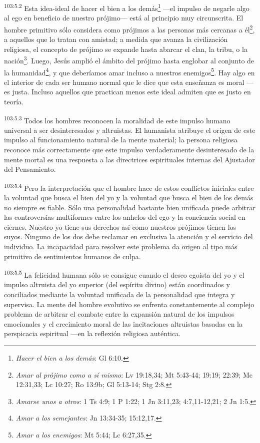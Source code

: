 \par
\textsuperscript{103:5.2} Esta idea-ideal de hacer el bien a los demás\footnote{\textit{Hacer el bien a los demás}: Gl 6:10.} ---el impulso de negarle algo al ego en beneficio de nuestro prójimo--- está al principio muy circunscrita. El hombre primitivo sólo considera como prójimos a las personas más cercanas a él\footnote{\textit{Amar al prójimo como a sí mismo}: Lv 19:18,34; Mt 5:43-44; 19:19; 22:39; Mc 12:31,33; Lc 10:27; Ro 13:9b; Gl 5:13-14; Stg 2:8.}, a aquellos que lo tratan con amistad; a medida que avanza la civilización religiosa, el concepto de prójimo se expande hasta abarcar el clan, la tribu, o la nación\footnote{\textit{Amarse unos a otros}: 1 Ts 4:9; 1 P 1:22; 1 Jn 3:11,23; 4:7,11-12,21; 2 Jn 1:5.}. Luego, Jesús amplió el ámbito del prójimo hasta englobar al conjunto de la humanidad\footnote{\textit{Amar a los semejantes}: Jn 13:34-35; 15:12,17.}, y que deberíamos amar incluso a nuestros enemigos\footnote{\textit{Amar a los enemigos}: Mt 5:44; Lc 6:27,35.}. Hay algo en el interior de cada ser humano normal que le dice que esta enseñanza es moral ---es justa. Incluso aquellos que practican menos este ideal admiten que es justo en teoría.

\par
\textsuperscript{103:5.3} Todos los hombres reconocen la moralidad de este impulso humano universal a ser desinteresados y altruistas. El humanista atribuye el origen de este impulso al funcionamiento natural de la mente material; la persona religiosa reconoce más correctamente que este impulso verdaderamente desinteresado de la mente mortal es una respuesta a las directrices espirituales internas del Ajustador del Pensamiento.

\par
\textsuperscript{103:5.4} Pero la interpretación que el hombre hace de estos conflictos iniciales entre la voluntad que busca el bien del yo y la voluntad que busca el bien de los demás no siempre es fiable. Sólo una personalidad bastante bien unificada puede arbitrar las controversias multiformes entre los anhelos del ego y la conciencia social en ciernes. Nuestro yo tiene sus derechos así como nuestros prójimos tienen los suyos. Ninguno de los dos debe reclamar en exclusiva la atención y el servicio del individuo. La incapacidad para resolver este problema da origen al tipo más primitivo de sentimientos humanos de culpa.

\par
\textsuperscript{103:5.5} La felicidad humana sólo se consigue cuando el deseo egoísta del yo y el impulso altruista del yo superior (del espíritu divino) están coordinados y conciliados mediante la voluntad unificada de la personalidad que integra y supervisa. La mente del hombre evolutivo se enfrenta constantemente al complejo problema de arbitrar el combate entre la expansión natural de los impulsos emocionales y el crecimiento moral de las incitaciones altruistas basadas en la perspicacia espiritual ---en la reflexión religiosa auténtica.

